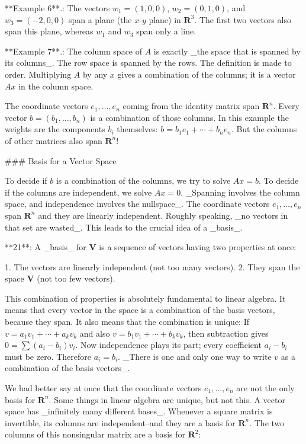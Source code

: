 

**Example 6**.: The vectors \(w_{1}=(1,0,0)\), \(w_{2}=(0,1,0)\), and \(w_{3}=(-2,0,0)\) span a plane (the \(x\)-\(y\) plane) in \(\mathbf{R}^{3}\). The first two vectors also span this plane, whereas \(w_{1}\) and \(w_{3}\) span only a line.

**Example 7**.: The column space of \(A\) is exactly _the space that is spanned by its columns_. The row space is spanned by the rows. The definition is made to order. Multiplying \(A\) by any \(x\) gives a combination of the columns; it is a vector \(Ax\) in the column space.

The coordinate vectors \(e_{1},\ldots,e_{n}\) coming from the identity matrix span \(\mathbf{R}^{n}\). Every vector \(b=(b_{1},\ldots,b_{n})\) is a combination of those columns. In this example the weights are the components \(b_{i}\) themselves: \(b=b_{1}e_{1}+\cdots+b_{n}e_{n}\). But the columns of other matrices also span \(\mathbf{R}^{n}\)!

### Basis for a Vector Space

To decide if \(b\) is a combination of the columns, we try to solve \(Ax=b\). To decide if the columns are independent, we solve \(Ax=0\). _Spanning involves the column space, and independence involves the nullspace_. The coordinate vectors \(e_{1},\ldots,e_{n}\) span \(\mathbf{R}^{n}\) and they are linearly independent. Roughly speaking, _no vectors in that set are wasted_. This leads to the crucial idea of a _basis_.

**21**: A _basis_ for \(\mathbf{V}\) is a sequence of vectors having two properties at once:

1. The vectors are linearly independent (not too many vectors).
2. They span the space \(\mathbf{V}\) (not too few vectors).

This combination of properties is absolutely fundamental to linear algebra. It means that every vector in the space is a combination of the basis vectors, because they span. It also means that the combination is unique: If \(v=a_{1}v_{1}+\cdots+a_{k}v_{k}\) and also \(v=b_{1}v_{1}+\cdots+b_{k}v_{k}\), then subtraction gives \(0=\sum(a_{i}-b_{i})v_{i}\). Now independence plays its part; every coefficient \(a_{i}-b_{i}\) must be zero. Therefore \(a_{i}=b_{i}\). _There is one and only one way to write \(v\) as a combination of the basis vectors_.

We had better say at once that the coordinate vectors \(e_{1},\ldots,e_{n}\) are not the only basis for \(\mathbf{R}^{n}\). Some things in linear algebra are unique, but not this. A vector space has _infinitely many different bases_. Whenever a square matrix is invertible, its columns are independent--and they are a basis for \(\mathbf{R}^{n}\). The two columns of this nonsingular matrix are a basis for \(\mathbf{R}^{2}\):

